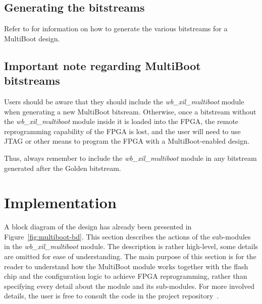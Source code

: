 \documentclass[a4paper,11pt]{article}
\begin{document}
\subsection{Generating the bitstreams}

Refer to \cite{gen-bitstream} for information on how to generate the various
bitstreams for a MultiBoot design.

\subsection{Important note regarding MultiBoot bitstreams}

Users should be aware that they should include the \textit{wb\_xil\_multiboot} module
when generating a new MultiBoot bitsream. Otherwise, once a bitstream without
the \textit{wb\_xil\_multiboot} module inside it is loaded into the FPGA, the
remote reprogramming capability of the FPGA is lost, and the user will need
to use JTAG or other means to program the FPGA with a MultiBoot-enabled design.

Thus, always remember to include the \textit{wb\_xil\_multiboot} module in any bitstream
generated after the Golden bitstream.

\section{Implementation}
\label{sec:implem}

A block diagram of the design has already been presented in
Figure~\ref{fig:multiboot-bd}. This section describes the actions of the sub-modules
in the \textit{wb\_xil\_multiboot} module. The description is rather high-level,
some details are omitted for ease of understanding. The main purpose of this
section is for the reader to understand how the MultiBoot module works together with
the flash chip and the configuration logic to achieve FPGA reprogramming, rather
than specifying every detail about the module and its sub-modules. For more involved
details, the user is free to consult the code in the project
repository~\cite{gencores-ohwr}.
\end{document}
